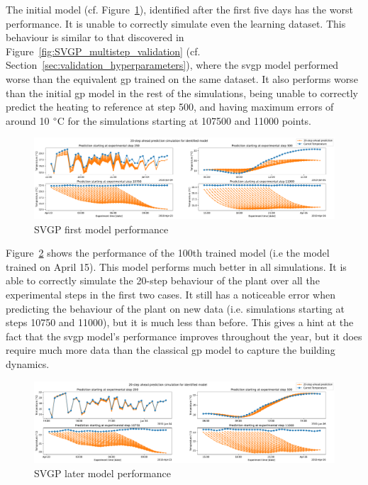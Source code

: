 The initial model (cf. Figure~\ref{fig:SVGP_first_model_performance}),
identified after the first five days has the worst performance. It is unable to
correctly simulate even the learning dataset. This behaviour is similar to that
discovered in Figure~\ref{fig:SVGP_multistep_validation}
(cf. Section~\ref{sec:validation_hyperparameters}), where the \acrshort{svgp}
model performed worse than the equivalent \acrshort{gp} trained on the same
dataset. It also performs worse than the initial \acrshort{gp} model in the rest
of the simulations, being unable to correctly predict the heating to reference
at step 500, and having maximum errors of around 10 $\degree$C for the simulations
starting at 107500 and 11000 points.

\begin{figure}[ht]
    \centering
    \includegraphics[width =
    \textwidth]{Plots/1_SVGP_480pts_inf_window_12_averageYear_first_model_performance.pdf}
    \caption{SVGP first model performance}
    \label{fig:SVGP_first_model_performance}
\end{figure}

\clearpage

Figure~\ref{fig:SVGP_later_model_performance} shows the performance of the 100th
trained model (i.e the model trained on April 15). This model performs much
better in all simulations. It is able to correctly simulate the 20-step
behaviour of the plant over all the experimental steps in the first two cases.
It still has a noticeable error when predicting the behaviour of the plant on
new data (i.e. simulations starting at steps 10750 and 11000), but it is much
less than before. This gives a hint at the fact that the \acrshort{svgp} model's
performance improves throughout the year, but it does require much more data
than the classical \acrshort{gp} model to capture the building dynamics.

\begin{figure}[ht]
    \centering
    \includegraphics[width =
    \textwidth]{Plots/1_SVGP_480pts_inf_window_12_averageYear_later_model_performance.pdf}
    \caption{SVGP later model performance}
    \label{fig:SVGP_later_model_performance}
\end{figure}

